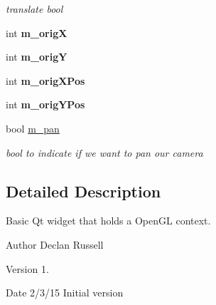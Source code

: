 \begin{DoxyCompactItemize}
\begin{DoxyCompactList}\small\item\em translate bool \end{DoxyCompactList}\item 
\hypertarget{class_open_g_l_widget_a214ce7f703333d6dc676cac7e0d49776}{int {\bfseries m\-\_\-orig\-X}}\label{class_open_g_l_widget_a214ce7f703333d6dc676cac7e0d49776}

\item 
\hypertarget{class_open_g_l_widget_a8703a19c51f242c7557ba6b37e893988}{int {\bfseries m\-\_\-orig\-Y}}\label{class_open_g_l_widget_a8703a19c51f242c7557ba6b37e893988}

\item 
\hypertarget{class_open_g_l_widget_a1b06aed484e4dba30493c77410f4a34e}{int {\bfseries m\-\_\-orig\-X\-Pos}}\label{class_open_g_l_widget_a1b06aed484e4dba30493c77410f4a34e}

\item 
\hypertarget{class_open_g_l_widget_a7e4b345141610c5aac3b293217c17d9d}{int {\bfseries m\-\_\-orig\-Y\-Pos}}\label{class_open_g_l_widget_a7e4b345141610c5aac3b293217c17d9d}

\item 
\hypertarget{class_open_g_l_widget_abadceadac28d7b1ac66fb41e652845f8}{bool \hyperlink{class_open_g_l_widget_abadceadac28d7b1ac66fb41e652845f8}{m\-\_\-pan}}\label{class_open_g_l_widget_abadceadac28d7b1ac66fb41e652845f8}

\begin{DoxyCompactList}\small\item\em bool to indicate if we want to pan our camera \end{DoxyCompactList}\end{DoxyCompactItemize}


\subsection{Detailed Description}
Basic Qt widget that holds a Open\-G\-L context. 

\begin{DoxyAuthor}{Author}
Declan Russell 
\end{DoxyAuthor}
\begin{DoxyVersion}{Version}
1. 
\end{DoxyVersion}
\begin{DoxyDate}{Date}
2/3/15 Initial version 
\end{DoxyDate}


